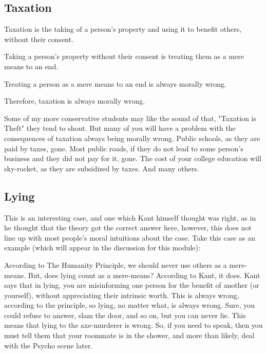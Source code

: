\subsection{Taxation}
\begin{earg}
    \item[] Taxation is the taking of a person’s property and using it to benefit others, without their consent.
    \item[] Taking a person’s property without their consent is treating them as a mere means to an end.
    \item[] Treating a person as a mere means to an end is always morally wrong.
    \item[] Therefore, taxation is always morally wrong.
\end{earg}
Some of my more conservative students may like the sound of that, "Taxation is Theft" they tend to shout. But many of you will have a problem with the consequences of taxation always being morally wrong. Public schools, as they are paid by taxes, gone. Most public roads, if they do not lead to some person's business and they did not pay for it, gone. The cost of your college education will sky-rocket, as they are subsidized by taxes. And many others.
\subsection{Lying}

This is an interesting case, and one which Kant himself thought was right, as in he thought that the theory got the correct answer here, however, this does not line up with most people's moral intuitions about the case. Take this case as an example (which will appear in the discussion for this module):


According to The Humanity Principle, we should never use others as a mere-means. But, does lying count as a mere-means? According to Kant, it does. Kant says that in lying, you are misinforming one person for the benefit of another (or yourself), without appreciating their intrinsic worth. This is always wrong, according to the principle, so lying, no matter what, is always wrong. Sure, you could refuse to answer, slam the door, and so on, but you can never lie. This means that lying to the axe-murderer is wrong. So, if you need to speak, then you must tell them that your roommate is in the shower, and more than likely, deal with the Psycho scene later. 

